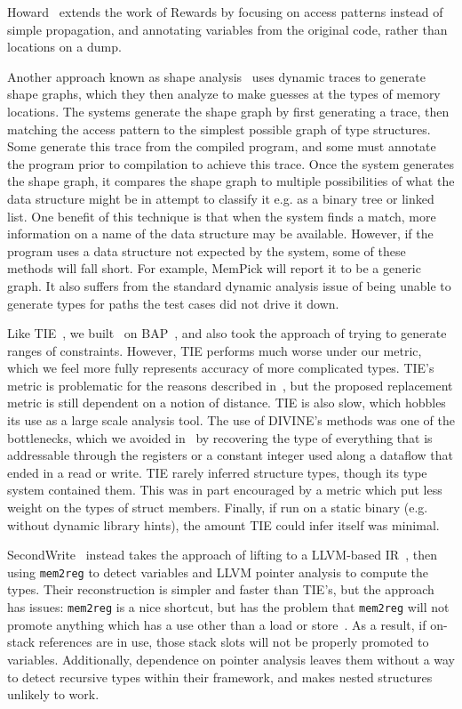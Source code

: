 Howard~\cite{Slowinska2011} extends the work of Rewards by focusing on access patterns instead of simple propagation, and annotating variables from the original code, rather than locations on a dump.

Another approach known as shape analysis~\cite{August, Haller2013a,White2013,Jung2009,Cozzie} uses dynamic traces to generate shape graphs, which they then analyze to make guesses at the types of memory locations. The systems generate the shape graph by first generating a trace, then matching the access pattern to the simplest possible graph of type structures. Some generate this trace from the compiled program, and some must annotate the program prior to compilation to achieve this trace. Once the system generates the shape graph, it compares the shape graph to multiple possibilities of what the data structure might be in attempt to classify it e.g. as a binary tree or linked list. One benefit of this technique is that when the system finds a match, more information on a name of the data structure may be available. However, if the program uses a data structure not expected by the system, some of these methods will fall short. For example, MemPick will report it to be a generic graph. It also suffers from the standard dynamic analysis issue of being unable to generate types for paths the test cases did not drive it down.

Like TIE~\cite{tie}, we built \bitr\ on BAP~\cite{bap}, and also took the approach of trying to generate ranges of constraints. However, TIE performs much worse under our metric, which we feel more fully represents accuracy of more complicated types. TIE's metric is problematic for the reasons described in~\cite{sw}, but the proposed replacement metric is still dependent on a notion of distance. TIE is also slow, which hobbles its use as a large scale analysis tool. The use of DIVINE's methods was one of the bottlenecks, which we avoided in \bitr\ by recovering the type of everything that is addressable through the registers or a constant integer used along a dataflow that ended in a read or write.
TIE rarely inferred structure types, though its type system contained them.
This was in part encouraged by a metric which put less weight on the types of struct members.
Finally, if run on a static binary (e.g. without dynamic library hints), the amount TIE could infer itself was minimal.

SecondWrite~\cite{sw} instead takes the approach of lifting to a LLVM-based IR~\cite{llvm}, then using \texttt{mem2reg} to detect variables and LLVM pointer analysis to compute the types. Their reconstruction is simpler and faster than TIE's, but the approach has issues: \texttt{mem2reg} is a nice shortcut, but has the problem that \texttt{mem2reg} will not promote anything which has a use other than a load or store~\cite{llvm}. As a result, if on-stack references are in use, those stack slots will not be properly promoted to variables. Additionally, dependence on pointer analysis leaves them without a way to detect recursive types within their framework, and makes nested structures unlikely to work.

